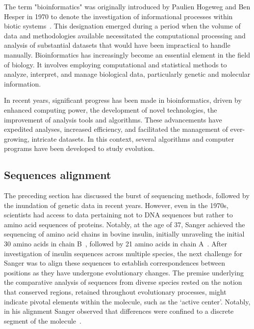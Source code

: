 The term "bioinformatics" was originally introduced by Paulien Hogeweg and Ben Hesper in 1970 to denote the investigation of informational processes within biotic systems~\citep{hesper_bioinformatica_1970, hogeweg_roots_2011}. This designation emerged during a period when the volume of data and methodologies available necessitated the computational processing and analysis of substantial datasets that would have been impractical to handle manually. Bioinformatics has increasingly become an essential element in the field of biology. It involves employing computational and statistical methods to analyze, interpret, and manage biological data, particularly genetic and molecular information.

In recent years, significant progress has been made in bioinformatics, driven by enhanced computing power, the development of novel technologies, the improvement of analysis tools and algorithms. These advancements have expedited analyses, increased efficiency, and facilitated the management of ever-growing, intricate datasets. In this context, several algorithms and computer programs have been developed to study evolution.


\subsection{Sequences alignment}

The preceding section has discussed the burst of sequencing methods, followed by the inundation of genetic data in recent years. However, even in the 1970s, scientists had access to data pertaining not to \acrshort{DNA} sequences but rather to amino acid sequences of proteins. Notably, at the age of 37, Sanger achieved the sequencing of amino acid chains in bovine insulin, initially unraveling the initial 30 amino acids in chain B~\citep{sanger_amino-acid_1951, sanger_amino-acid_1951-1}, followed by 21 amino acids in chain A~\citep{sanger_amino-acid_1953, sanger_amino-acid_1953-1}. After investigation of insulin sequences across multiple species, the next challenge for Sanger was to align these sequences to establish correspondences between positions as they have undergone evolutionary changes. The premise underlying the comparative analysis of sequences from diverse species rested on the notion that conserved regions, retained throughout evolutionary processes, might indicate pivotal elements within the molecule, such as the `active center'. Notably, in his alignment Sanger observed that differences were confined to a discrete segment of the molecule~\citep{sanger_species_1949, brown_structure_1955, harris_species_1956}.

